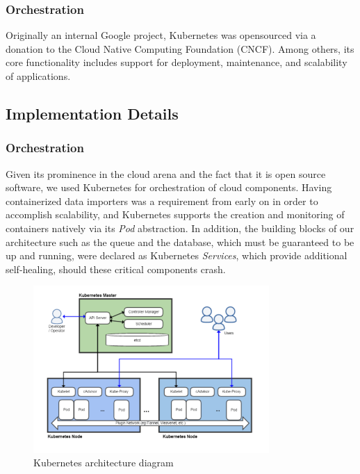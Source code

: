 \subsubsection{Orchestration}\label{orchestration}

Originally an internal Google project, Kubernetes was opensourced via a
donation to the Cloud Native Computing Foundation (CNCF). Among others,
its core functionality includes support for deployment, maintenance, and
scalability of applications.

\subsection{Implementation Details}\label{implementation-details}

\subsubsection{Orchestration}\label{orchestration-1}

Given its prominence in the cloud arena and the fact that it is open
source software, we used Kubernetes for orchestration of cloud
components. Having containerized data importers was a requirement from
early on in order to accomplish scalability, and Kubernetes supports the
creation and monitoring of containers natively via its \emph{Pod}
abstraction. In addition, the building blocks of our architecture such
as the queue and the database, which must be guaranteed to be up and
running, were declared as Kubernetes \emph{Services}, which provide
additional self-healing, should these critical components crash.

\begin{figure}[htbp]
  \centering
  \includegraphics[width=0.80\textwidth]{images/Kubernetes.png}
  \caption{Kubernetes architecture diagram \cite{WikiCommons:KubernetesArchitecture}}
\end{figure}

